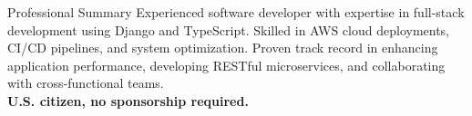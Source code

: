 \documentclass{resume} %
\begin{document}
\begin{rSection}{Professional Summary}
Experienced software developer with expertise in full-stack development using Django and TypeScript. Skilled in AWS cloud deployments, CI/CD pipelines, and system optimization. Proven track record in enhancing application performance, developing RESTful microservices, and collaborating with cross-functional teams. \\
\textbf{U.S. citizen, no sponsorship required.}
\end{rSection}



\end{document}
